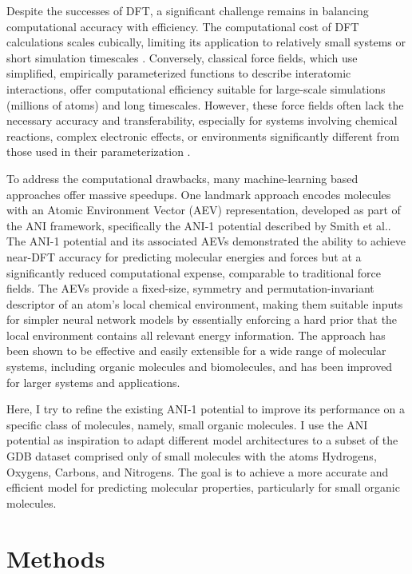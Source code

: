 \documentclass[11pt, twocolumn]{article}
\begin{document}
Despite the successes of DFT, a significant challenge remains in balancing computational accuracy with efficiency. The computational cost of DFT calculations scales cubically, limiting its application to relatively small systems or short simulation timescales \cite{engel2011density, cohen2012challenges}. Conversely, classical force fields, which use simplified, empirically parameterized functions to describe interatomic interactions, offer computational efficiency suitable for large-scale simulations (millions of atoms) and long timescales. However, these force fields often lack the necessary accuracy and transferability, especially for systems involving chemical reactions, complex electronic effects, or environments significantly different from those used in their parameterization \cite{herbers2013grand}.

To address the computational drawbacks, many machine-learning based approaches offer massive speedups. One landmark approach encodes molecules with an Atomic Environment Vector (AEV) representation, developed as part of the ANI framework, specifically the ANI-1 potential described by Smith et al.. \cite{smith2017ani} The ANI-1 potential and its associated AEVs demonstrated the ability to achieve near-DFT accuracy for predicting molecular energies and forces but at a significantly reduced computational expense, comparable to traditional force fields. The AEVs provide a fixed-size, symmetry and permutation-invariant descriptor of an atom's local chemical environment, making them suitable inputs for simpler neural network models by essentially enforcing a hard prior that the local environment contains all relevant energy information. The approach has been shown to be effective and easily extensible for a wide range of molecular systems, including organic molecules and biomolecules, and has been improved for larger systems and applications. \cite{devereux2020extending}

Here, I try to refine the existing ANI-1 potential to improve its performance on a specific class of molecules, namely, small organic molecules. I use the ANI potential as inspiration to adapt different model architectures to a subset of the GDB dataset \cite{ruddigkeit2012enumeration} comprised only of small molecules with the atoms Hydrogens, Oxygens, Carbons, and Nitrogens. The goal is to achieve a more accurate and efficient model for predicting molecular properties, particularly for small organic molecules.

\section{Methods}
\end{document}
